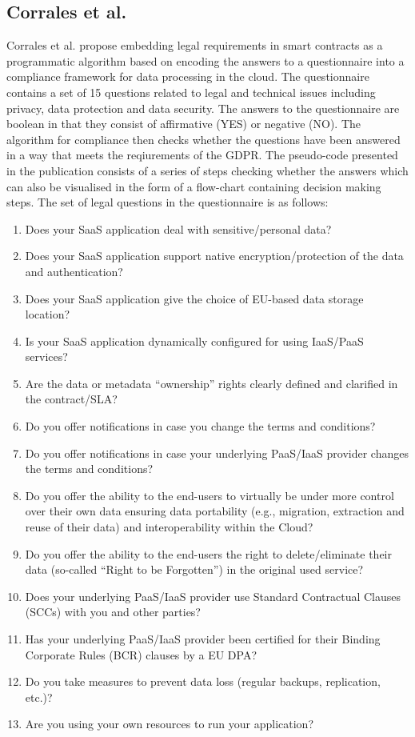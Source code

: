 \subsection{Corrales et al.}
Corrales et al. \cite{corrales_smart_2019} propose embedding legal requirements in smart contracts as a programmatic algorithm based on encoding the answers to a questionnaire into a compliance framework for data processing in the cloud. The questionnaire contains a set of 15 questions related to legal and technical issues including privacy, data protection and data security. The answers to the questionnaire are boolean in that they consist of affirmative (YES) or negative (NO). The algorithm for compliance then checks whether the questions have been answered in a way that meets the reqiurements of the GDPR. The pseudo-code presented in the publication consists of a series of steps checking whether the answers which can also be visualised in the form of a flow-chart containing decision making steps. The set of legal questions in the questionnaire is as follows:
\begin{enumerate}
    \item Does your SaaS application deal with sensitive/personal data?
    \item Does your SaaS application support native encryption/protection of the data and
authentication?
    \item Does your SaaS application give the choice of EU-based data storage location?
    \item Is your SaaS application dynamically configured for using IaaS/PaaS services?
    \item Are the data or metadata “ownership” rights clearly defined and clarified in the
contract/SLA?
    \item Do you offer notifications in case you change the terms and conditions?
    \item Do you offer notifications in case your underlying PaaS/IaaS provider changes the
terms and conditions?
    \item Do you offer the ability to the end-users to virtually be under more control over
their own data ensuring data portability (e.g., migration, extraction and reuse of their
data) and interoperability within the Cloud?
    \item Do you offer the ability to the end-users the right to delete/eliminate their data
(so-called “Right to be Forgotten”) in the original used service?
    \item Does your underlying PaaS/IaaS provider use Standard Contractual Clauses
(SCCs) with you and other parties?
    \item Has your underlying PaaS/IaaS provider been certified for their Binding
Corporate Rules (BCR) clauses by a EU DPA?
    \item Do you take measures to prevent data loss (regular backups, replication, etc.)?
    \item Are you using your own resources to run your application?
\end{enumerate}

